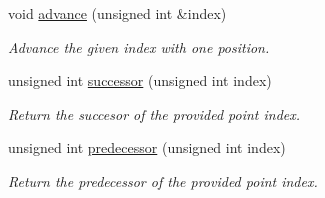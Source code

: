 \begin{DoxyCompactItemize}
void \hyperlink{classmultiscale_1_1MinEnclosingTriangleFinder_af52c24da93e4660f043dbb0f92594a19}{advance} (unsigned int \&index)
\begin{DoxyCompactList}\small\item\em Advance the given index with one position. \end{DoxyCompactList}\item 
unsigned int \hyperlink{classmultiscale_1_1MinEnclosingTriangleFinder_a075472a453bfcb0eedd06a4a185241fc}{successor} (unsigned int index)
\begin{DoxyCompactList}\small\item\em Return the succesor of the provided point index. \end{DoxyCompactList}\item 
unsigned int \hyperlink{classmultiscale_1_1MinEnclosingTriangleFinder_aa5ec6fafd63c6d99d095dfc58c47cd4e}{predecessor} (unsigned int index)
\begin{DoxyCompactList}\small\item\em Return the predecessor of the provided point index. \end{DoxyCompactList}\end{DoxyCompactItemize}
